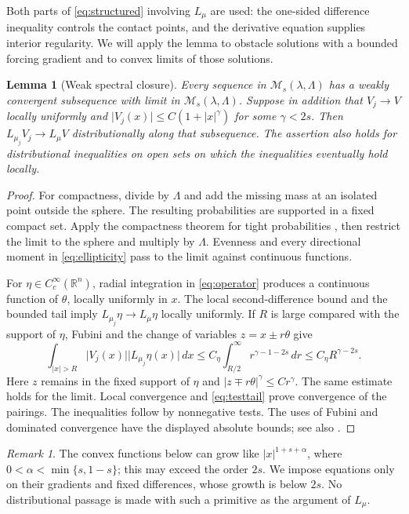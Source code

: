 \documentclass[11pt]{article}
\numberwithin{equation}{section}
\newtheorem{lemma}[theorem]{Lemma}
\theoremstyle{remark}
\newtheorem{remark}[theorem]{Remark}
\newcommand{\R}{\mathbb R}
\newcommand{\abs}[1]{\lvert #1\rvert}
\newcommand{\dd}{\,d}
\newcommand{\M}{\mathcal M_{s}(\lambda,\Lambda)}
\begin{document}
Both parts of \eqref{eq:structured} involving $L_\mu$ are used: the one-sided difference inequality controls the contact points, and the derivative equation supplies interior regularity. We will apply the lemma to obstacle solutions with a bounded forcing gradient and to convex limits of those solutions.

\begin{lemma}[Weak spectral closure]\label{lem:closure}
Every sequence in $\M$ has a weakly convergent subsequence with limit in $\M$. Suppose in addition that $V_j\to V$ locally uniformly and
$\abs{V_j(x)}\le C(1+\abs{x}^{\gamma})$ for some $\gamma<2s$. Then $L_{\mu_j}V_j\to L_\mu V$ distributionally along that subsequence. The assertion also holds for distributional inequalities on open sets on which the inequalities eventually hold locally.
\end{lemma}
\begin{proof}
For compactness, divide by $\Lambda$ and add the missing mass at an isolated point outside the sphere. The resulting probabilities are supported in a fixed compact set. Apply the compactness theorem for tight probabilities \cite[Theorem 2.2.35]{FRO}, then restrict the limit to the sphere and multiply by $\Lambda$. Evenness and every directional moment in \eqref{eq:ellipticity} pass to the limit against continuous functions.

For $\eta\in C_c^\infty(\R^n)$, radial integration in \eqref{eq:operator} produces a continuous function of $\theta$, locally uniformly in $x$. The local second-difference bound and the bounded tail imply $L_{\mu_j}\eta\to L_\mu\eta$ locally uniformly. If $R$ is large compared with the support of $\eta$, Fubini and the change of variables $z=x\pm r\theta$ give
\begin{equation}\label{eq:testtail}
 \int_{\abs{x}>R}\abs{V_j(x)}\abs{L_{\mu_j}\eta(x)}\dd x
 \le C_\eta\int_{R/2}^\infty r^{\gamma-1-2s}\dd r
 \le C_\eta R^{\gamma-2s}.
\end{equation}
Here $z$ remains in the fixed support of $\eta$ and $\abs{z\mp r\theta}^{\gamma}\le Cr^\gamma$. The same estimate holds for the limit. Local convergence and \eqref{eq:testtail} prove convergence of the pairings. The inequalities follow by nonnegative tests. The uses of Fubini and dominated convergence have the displayed absolute bounds; see also \cite[Theorems 1.4.49 and 1.7.21]{TaoMeasure}.
\end{proof}

\begin{remark}\label{rem:primitive}
The convex functions below can grow like $\abs{x}^{1+s+\alpha}$, where $0<\alpha<\min\{s,1-s\}$; this may exceed the order $2s$. We impose equations only on their gradients and fixed differences, whose growth is below $2s$. No distributional passage is made with such a primitive as the argument of $L_\mu$.
\end{remark}
\end{document}
